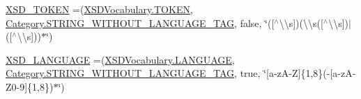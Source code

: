 \begin{DoxyCompactItemize}
\item 
\hyperlink{enumorg_1_1semanticweb_1_1owlapi_1_1vocab_1_1_o_w_l2_datatype_ab0d55b2fd24143a14e6a39a84dcf8bd6}{X\-S\-D\-\_\-\-T\-O\-K\-E\-N} =(\hyperlink{enumorg_1_1semanticweb_1_1owlapi_1_1vocab_1_1_x_s_d_vocabulary_ab7d2aaa2bcc22a2cf82afee863ff6a35}{X\-S\-D\-Vocabulary.\-T\-O\-K\-E\-N}, \hyperlink{enumorg_1_1semanticweb_1_1owlapi_1_1vocab_1_1_o_w_l2_datatype_1_1_category_a44f9e4681f05aa129189fc174186298a}{Category.\-S\-T\-R\-I\-N\-G\-\_\-\-W\-I\-T\-H\-O\-U\-T\-\_\-\-L\-A\-N\-G\-U\-A\-G\-E\-\_\-\-T\-A\-G}, false, \char`\"{}(\mbox{[}$^\wedge$\textbackslash{}\textbackslash{}s\mbox{]})(\textbackslash{}\textbackslash{}s(\mbox{[}$^\wedge$\textbackslash{}\textbackslash{}s\mbox{]})$|$(\mbox{[}$^\wedge$\textbackslash{}\textbackslash{}s\mbox{]}))$\ast$\char`\"{})
\item 
\hyperlink{enumorg_1_1semanticweb_1_1owlapi_1_1vocab_1_1_o_w_l2_datatype_a1dbe7e06d8d371df5f4e446badc5c789}{X\-S\-D\-\_\-\-L\-A\-N\-G\-U\-A\-G\-E} =(\hyperlink{enumorg_1_1semanticweb_1_1owlapi_1_1vocab_1_1_x_s_d_vocabulary_a97caa0a9ecc52d652717cc24430c829c}{X\-S\-D\-Vocabulary.\-L\-A\-N\-G\-U\-A\-G\-E}, \hyperlink{enumorg_1_1semanticweb_1_1owlapi_1_1vocab_1_1_o_w_l2_datatype_1_1_category_a44f9e4681f05aa129189fc174186298a}{Category.\-S\-T\-R\-I\-N\-G\-\_\-\-W\-I\-T\-H\-O\-U\-T\-\_\-\-L\-A\-N\-G\-U\-A\-G\-E\-\_\-\-T\-A\-G}, true, \char`\"{}\mbox{[}a-\/z\-A-\/Z\mbox{]}\{1,8\}(-\/\mbox{[}a-\/z\-A-\/Z0-\/9\mbox{]}\{1,8\})$\ast$\char`\"{})
\item 

\end{DoxyCompactItemize}
